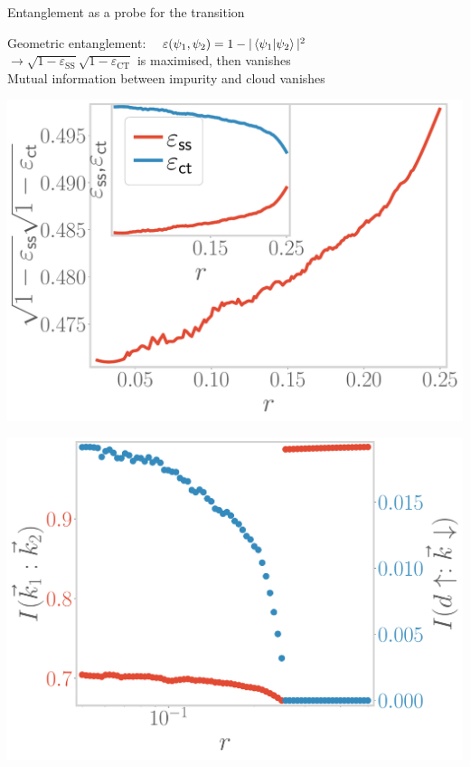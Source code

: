 \documentclass[10pt,aspectratio=169]{beamer}
\begin{document}
\begin{frame}{Entanglement as a probe for the transition}

	Geometric entanglement: ~ \(\varepsilon(\psi_1,\psi_2) = 1 - |\braket{\psi_1|\psi_2}|^2\)\\[10pt]
	\(\longrightarrow \sqrt{1 -\varepsilon_\text{SS}}\sqrt{1 -\varepsilon_\text{CT}}\) is maximised, then vanishes\\[10pt]
	Mutual information between impurity and cloud vanishes\\[10pt]

\begin{minipage}{0.49\textwidth}
	\includegraphics[width=\textwidth]{entanglement.pdf}
\end{minipage}
\hspace*{\fill}
\begin{minipage}{0.49\textwidth}
	\includegraphics[width=\textwidth]{I_k.pdf}
\end{minipage}

\end{frame}
\end{document}
